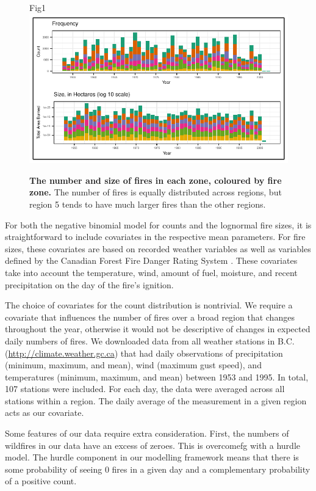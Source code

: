 \documentclass[10pt,letterpaper]{article}
\begin{document}
\begin{figure}[h!]
\centering
Fig1
\includegraphics[width=\textwidth]{Joint_Count_Files/firezones-1.pdf}
\caption{\label{firezones}\textbf{The number
and size of fires in each zone, coloured by fire zone.} The number of fires is equally
distributed across regions, but region 5 tends to have much larger fires
than the other regions.}
\end{figure}

For both the negative binomial model for counts and the lognormal fire
sizes, it is straightforward to include covariates in the respective
mean parameters. For fire sizes, these covariates are based on recorded
weather variables as well as variables defined by the Canadian Forest
Fire Danger Rating System \cite{wottonLightningFirePrediction2012}.
These covariates take into account the temperature, wind, amount of
fuel, moisture, and recent precipitation on the day of the fire's
ignition.

The choice of covariates for the count distribution is nontrivial. We
require a covariate that influences the number of fires over a broad
region that changes throughout the year, otherwise it would not be
descriptive of changes in expected daily numbers of fires. We downloaded
data from all weather stations in B.C.
(\url{http://climate.weather.gc.ca}) that had daily observations of
precipitation (minimum, maximum, and mean), wind (maximum gust speed),
and temperatures (minimum, maximum, and mean) between 1953 and 1995.
In total, 107 stations were included. For each day, the data were
averaged across all stations within a region. The daily average of the
measurement in a given region acts as our covariate.

Some features of our data require extra consideration. First, the
numbers of wildfires in our data have an excess of zeroes. This is overcomefg
with a hurdle model. The hurdle component in our modelling framework means that there is some probability of
seeing 0 fires in a given day and a complementary probability of a positive count.
\end{document}
